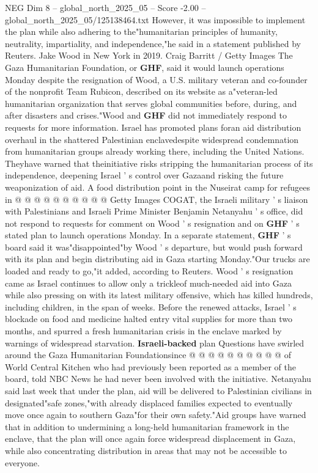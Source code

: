 \begin{textsample}{NEG Dim 8 – global\_north\_2025\_05 – Score -2.00 – global\_north\_2025\_05/125138464.txt}  \label{ex:f8_neg_058}
However, it was impossible to implement the plan while also adhering to the"humanitarian principles of humanity, neutrality, impartiality, and independence,"he said in a statement published by Reuters.
Jake Wood in New York in 2019.
Craig Barritt / Getty Images The Gaza Humanitarian Foundation, or \textbf{GHF}, said it would launch operations Monday despite the resignation of Wood, a U.S. military veteran and co-founder of the nonprofit Team Rubicon, described on its website as a"veteran-led humanitarian organization that serves global communities before, during, and after disasters and crises."Wood and \textbf{GHF} did not immediately respond to requests for more information.
Israel has promoted plans foran aid distribution overhaul in the shattered Palestinian enclavedespite widespread condemnation from humanitarian groups already working there, including the United Nations.
Theyhave warned that theinitiative risks stripping the humanitarian process of its independence, deepening Israel ' s control over Gazaand risking the future weaponization of aid.
A food distribution point in the Nuseirat camp for refugees in @ @ @ @ @ @ @ @ @ @ Getty Images COGAT, the Israeli military ' s liaison with Palestinians and Israeli Prime Minister Benjamin Netanyahu ' s office, did not respond to requests for comment on Wood ' s resignation and on \textbf{GHF} ' s stated plan to launch operations Monday.
In a separate statement, \textbf{GHF} ' s board said it was"disappointed"by Wood ' s departure, but would push forward with its plan and begin distributing aid in Gaza starting Monday."Our trucks are loaded and ready to go,"it added, according to Reuters.
Wood ' s resignation came as Israel continues to allow only a trickleof much-needed aid into Gaza while also pressing on with its latest military offensive, which has killed hundreds, including children, in the span of weeks.
Before the renewed attacks, Israel ' s blockade on food and medicine halted entry vital supplies for more than two months, and spurred a fresh humanitarian crisis in the enclave marked by warnings of widespread starvation. \textbf{Israeli-backed} plan Questions have swirled around the Gaza Humanitarian Foundationsince @ @ @ @ @ @ @ @ @ @ of World Central Kitchen who had previously been reported as a member of the board, told NBC News he had never been involved with the initiative.
Netanyahu said last week that under the plan, aid will be delivered to Palestinian civilians in designated"safe zones,"with already displaced families expected to eventually move once again to southern Gaza"for their own safety."Aid groups have warned that in addition to undermining a long-held humanitarian framework in the enclave, that the plan will once again force widespread displacement in Gaza, while also concentrating distribution in areas that may not be accessible to everyone.

\end{textsample}

